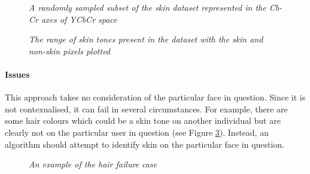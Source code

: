 \begin{figure}
    \centering
    \scalebox{0.8}{ }
   \caption{\textit{A randomly sampled subset of the skin dataset represented in the Cb-Cr axes of YCbCr space} }
   \label{fig:skin_ycbcr}
\end{figure}
\begin{figure}
    \centering
    \scalebox{0.8}{}
   \caption{\textit{The range of skin tones present in the dataset with the skin and non-skin pixels plotted} }
   \label{fig:skin_ycbcr_zoomed}
\end{figure}
\paragraph{Issues}
This approach takes no consideration of the particular face in question. Since it is not contexualised, it can fail in several circumstances.
For example, there are some hair colours which could be a skin tone on another individual but are clearly not on the particular user in question (see Figure \ref{fig:hair_failure}).
Instead, an algorithm should attempt to identify skin on the particular face in question.
\begin{figure}[H]
    \centering
    \qquad
   \caption{\textit{An example of the hair failure case}}
   \label{fig:hair_failure}
\end{figure}

